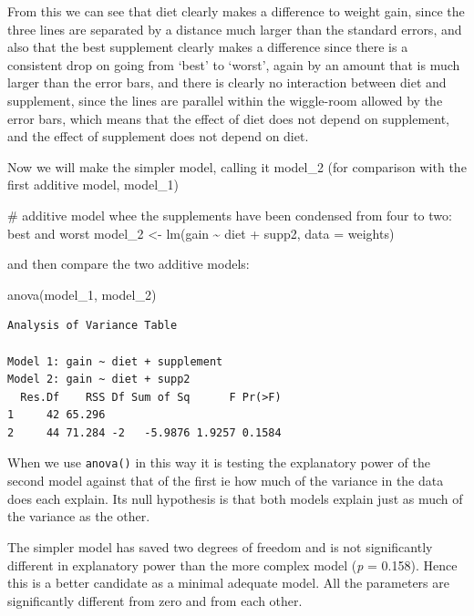 \documentclass[
  letterpaper,
  DIV=11,
  numbers=noendperiod]{scrreprt}
\newenvironment{Shaded}{\begin{snugshade}}{\end{snugshade}}
\newcommand{\AttributeTok}[1]{\textcolor[rgb]{0.40,0.45,0.13}{#1}}
\newcommand{\CommentTok}[1]{\textcolor[rgb]{0.37,0.37,0.37}{#1}}
\newcommand{\FunctionTok}[1]{\textcolor[rgb]{0.28,0.35,0.67}{#1}}
\newcommand{\NormalTok}[1]{\textcolor[rgb]{0.00,0.23,0.31}{#1}}
\newcommand{\OtherTok}[1]{\textcolor[rgb]{0.00,0.23,0.31}{#1}}
\newcommand{\SpecialCharTok}[1]{\textcolor[rgb]{0.37,0.37,0.37}{#1}}
\begin{document}
From this we can see that diet clearly makes a difference to weight
gain, since the three lines are separated by a distance much larger than
the standard errors, and also that the best supplement clearly makes a
difference since there is a consistent drop on going from `best' to
`worst', again by an amount that is much larger than the error bars, and
there is clearly no interaction between diet and supplement, since the
lines are parallel within the wiggle-room allowed by the error bars,
which means that the effect of diet does not depend on supplement, and
the effect of supplement does not depend on diet.

Now we will make the simpler model, calling it model\_2 (for comparison
with the first additive model, model\_1)

\begin{Shaded}
\begin{Highlighting}[]
\CommentTok{\# additive model whee the supplements have been condensed from four to two: best and worst}
\NormalTok{model\_2 }\OtherTok{\textless{}{-}} \FunctionTok{lm}\NormalTok{(gain }\SpecialCharTok{\textasciitilde{}}\NormalTok{ diet }\SpecialCharTok{+}\NormalTok{ supp2, }\AttributeTok{data =}\NormalTok{ weights)}
\end{Highlighting}
\end{Shaded}

and then compare the two additive models:

\begin{Shaded}
\begin{Highlighting}[]
\FunctionTok{anova}\NormalTok{(model\_1, model\_2)}
\end{Highlighting}
\end{Shaded}

\begin{verbatim}
Analysis of Variance Table

Model 1: gain ~ diet + supplement
Model 2: gain ~ diet + supp2
  Res.Df    RSS Df Sum of Sq      F Pr(>F)
1     42 65.296                           
2     44 71.284 -2   -5.9876 1.9257 0.1584
\end{verbatim}

When we use \texttt{anova()} in this way it is testing the explanatory
power of the second model against that of the first ie how much of the
variance in the data does each explain. Its null hypothesis is that both
models explain just as much of the variance as the other.

The simpler model has saved two degrees of freedom and is not
significantly different in explanatory power than the more complex model
(\emph{p} = 0.158). Hence this is a better candidate as a minimal
adequate model. All the parameters are significantly different from zero
and from each other.
\end{document}
